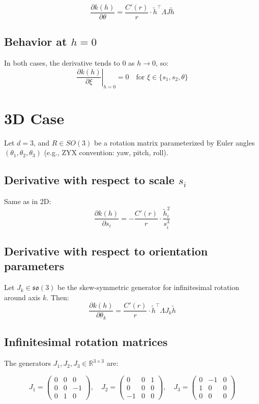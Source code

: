 \documentclass{article}
\begin{document}
\[
\frac{\partial k(h)}{\partial \theta} = \frac{C'(r)}{r} \cdot \tilde{h}^\top \Lambda J \tilde{h}
\]

\subsection*{Behavior at \( h = 0 \)}

In both cases, the derivative tends to 0 as \( h \to 0 \), so:
\[
\left. \frac{\partial k(h)}{\partial \xi} \right|_{h = 0} = 0
\quad \text{for } \xi \in \{s_1, s_2, \theta\}
\]

\section*{3D Case}

Let \( d = 3 \), and \( R \in SO(3) \) be a rotation matrix parameterized by Euler angles \( (\theta_1, \theta_2, \theta_3) \) (e.g., ZYX convention: yaw, pitch, roll).

\subsection*{Derivative with respect to scale \( s_i \)}

Same as in 2D\@:
\[
\frac{\partial k(h)}{\partial s_i} = - \frac{C'(r)}{r} \cdot \frac{\tilde{h}_i^2}{s_i^3}
\]

\subsection*{Derivative with respect to orientation parameters}

Let \( J_k \in \mathfrak{so}(3) \) be the skew-symmetric generator for infinitesimal rotation around axis \( k \). Then:
\[
\frac{\partial k(h)}{\partial \theta_k} = \frac{C'(r)}{r} \cdot \tilde{h}^\top \Lambda J_k \tilde{h}
\]

\subsection*{Infinitesimal rotation matrices}

The generators \( J_1, J_2, J_3 \in \mathbb{R}^{3 \times 3} \) are:

\[
J_1 = \begin{pmatrix}
0 & 0 & 0 \\
0 & 0 & -1 \\
0 & 1 & 0
\end{pmatrix}, \quad
J_2 = \begin{pmatrix}
0 & 0 & 1 \\
0 & 0 & 0 \\
-1 & 0 & 0
\end{pmatrix}, \quad
J_3 = \begin{pmatrix}
0 & -1 & 0 \\
1 & 0 & 0 \\
0 & 0 & 0
\end{pmatrix}
\]
\end{document}
